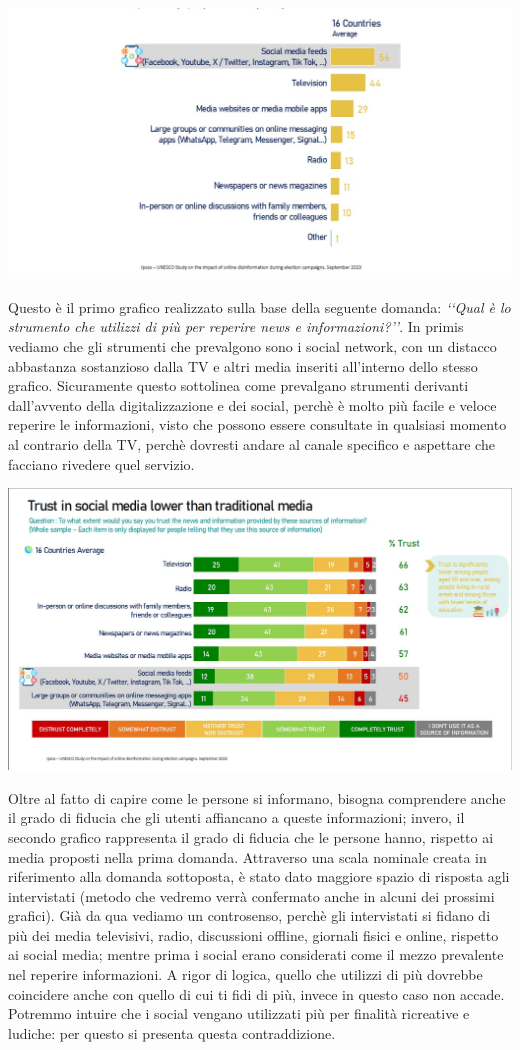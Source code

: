 \documentclass{article}
\begin{document}
\centering\includegraphics[width=0.6\linewidth]{Immagini/Grafico1.jpg}\\
    \begin{justify}
    Questo è il primo grafico realizzato sulla base della seguente domanda: \textit{‘‘Qual è lo strumento che utilizzi di più per reperire news e informazioni?’’}.
    In primis vediamo che gli strumenti che prevalgono sono i social network, con un distacco abbastanza sostanzioso dalla TV e altri media inseriti all'interno dello stesso grafico. Sicuramente questo sottolinea come prevalgano strumenti derivanti dall'avvento della digitalizzazione e dei social, perchè è molto più facile e veloce reperire le informazioni, visto che possono essere consultate in qualsiasi momento al contrario della TV, perchè dovresti andare al canale specifico e aspettare che facciano rivedere quel servizio.
    
\begin{center}
\includegraphics[width=0.6\linewidth]{Immagini/Grafico2.jpg}\\
\end{center}
    Oltre al fatto di capire come le persone si informano, bisogna comprendere anche il grado di fiducia che gli utenti affiancano a queste informazioni; invero, il secondo grafico rappresenta il grado di fiducia che le persone hanno, rispetto ai media proposti nella prima domanda.
    Attraverso una scala nominale creata in riferimento alla domanda sottoposta, è stato dato maggiore spazio di risposta agli intervistati (metodo che vedremo verrà confermato anche in alcuni dei prossimi grafici).
    Già da qua vediamo un controsenso, perchè gli intervistati si fidano di più dei media televisivi, radio, discussioni offline, giornali fisici e online, rispetto ai social media; mentre prima i social erano considerati come il mezzo prevalente nel reperire informazioni. A rigor di logica, quello che utilizzi di più dovrebbe coincidere anche con quello di cui ti fidi di più, invece in questo caso non accade. Potremmo intuire che i social vengano utilizzati più per finalità ricreative e ludiche: per questo si presenta questa contraddizione.
    

\end{justify}
\end{document}
